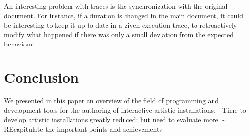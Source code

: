 \documentclass{sigchi}
\begin{document}
An interesting problem with traces is the synchronization with the original document. For instance, if a duration is changed in the main document, it could be interesting to keep it up to date in a given execution trace, to retroactively modify what happened if there was only a small deviation from the expected behaviour.

\section{Conclusion}
We presented in this paper an overview of the field of programming and development tools for the authoring of interactive artistic installations.
- Time to develop artistic installations greatly reduced; but need to evaluate more.
- REcapitulate the important points and achievements



\end{document}
